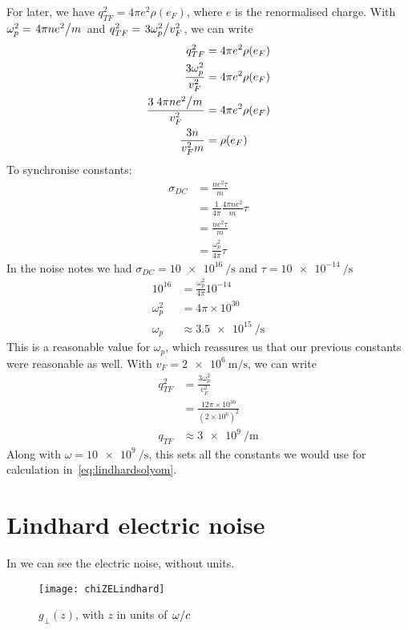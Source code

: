 \documentclass[../main.tex]{subfiles}
\begin{document}
	For later, we have $q_{TF}^2 = 4 \pi e^2 \rho(e_F)$, where $e$ is the renormalised charge.
	With $\omega_p^2 = \flatfrac{4 \pi n e^2}{m}$ and $q_{TF}^2 = \flatfrac{3 \omega_p^2}{v_F^2}$, we can write
	\begin{align}
		q_{TF}^2 &= 4 \pi e^2 \rho(e_F) \\
		\frac{3 \omega_p^2}{v_F^2} &= 4 \pi e^2 \rho(e_F) \\
		\frac{3 \flatfrac{4 \pi n e^2}{m}}{v_F^2} &= 4 \pi e^2 \rho(e_F) \\
		\frac{3n}{v_F^2 m} &= \rho(e_F) \\
	\end{align}
	To synchronise constants:
	\begin{align}
		\sigma_{DC} &= \frac{n e^2 \tau}{m} \\
		&= \frac{1}{4\pi}\frac{4 \pi n e^2}{m} \tau \\
		&= \frac{n e^2 \tau}{m} \\
		&= \frac{\omega_p^2}{4\pi}\tau
	\end{align}
	In the noise notes we had $\sigma_{DC} = \SI{10e16}{\per\second}$ and $\tau = \SI{10e-14}{\per\second}$
	\begin{align}
		10^{16} &= \frac{\omega_p^2}{4\pi} 10^{-14}\\
		\omega_p^2 &= 4 \pi \times 10^{30} \\
		\omega_p &\approx \SI{3.5e15}{\per\second}
	\end{align}
	This is a reasonable value for $\omega_p$, which reassures us that our previous constants were reasonable as well.
	With $v_F = \SI{2e6}{\m \per \s}$, we can write
	\begin{align}
		q_{TF}^2 &= \frac{3 \omega_p^2}{v_F^2} \\
		&= \frac{12\pi \times 10^{30}}{\left( 2 \times 10^6 \right)^2} \\
		q_{TF} &\approx \SI{3e9}{\per\m}
	\end{align}
	Along with $\omega = \SI{10e9}{\per\second}$, this sets all the constants we would use for calculation in~\eqref{eq:lindhardsolyom}.
	\section{Lindhard electric noise} \label{sec:ElectricNoise}
	In  we can see the electric noise, without units.
	\begin{figure}[htp]
		\centering
		\texttt{[image: chiZELindhard]}
		\caption{$g_{\perp}(z)$, with $z$ in units of $\flatfrac{\omega}{c}$} \label{fig:chizee}
	\end{figure}
\end{document}
